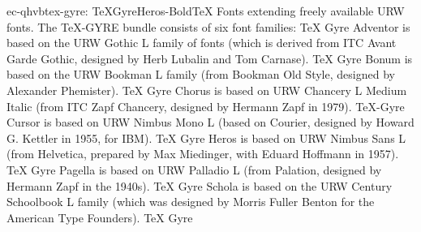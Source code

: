 \documentclass{ddltxtyp}
\begin{document}
\begin{package}{ec-qhvb}{tex-gyre: TeXGyreHeros-Bold}{{\TeX} Fonts extending freely available URW fonts.}
The {\TeX}-GYRE bundle consists of six font families: {\TeX} Gyre
Adventor is based on the URW Gothic L family of fonts (which is
derived from ITC Avant Garde Gothic, designed by Herb Lubalin
and Tom Carnase). {\TeX} Gyre Bonum is based on the URW Bookman L
family (from Bookman Old Style, designed by Alexander
Phemister). {\TeX} Gyre Chorus is based on URW Chancery L Medium
Italic (from ITC Zapf Chancery, designed by Hermann Zapf in
1979). {\TeX}-Gyre Cursor is based on URW Nimbus Mono L (based on
Courier, designed by Howard G. Kettler in 1955, for IBM). {\TeX}
Gyre Heros is based on URW Nimbus Sans L (from Helvetica,
prepared by Max Miedinger, with Eduard Hoffmann in 1957). {\TeX}
Gyre Pagella is based on URW Palladio L (from Palation,
designed by Hermann Zapf in the 1940s). {\TeX} Gyre Schola is
based on the URW Century Schoolbook L family (which was
designed by Morris Fuller Benton for the American Type
Founders). {\TeX} Gyre %
\end{package}
\end{document}
